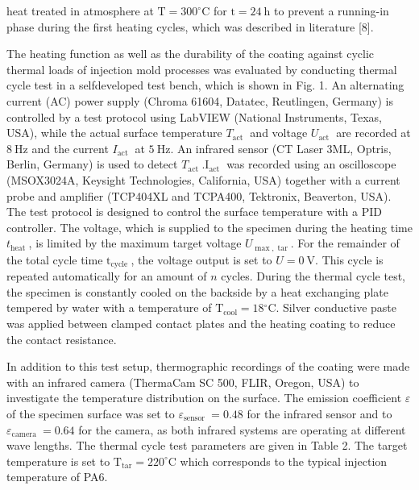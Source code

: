 \documentclass[10pt]{article}
\begin{document}
heat treated in atmosphere at $\mathrm{T}=300^{\circ} \mathrm{C}$ for $\mathrm{t}=24 \mathrm{~h}$ to prevent a running-in phase during the first heating cycles, which was described in literature [8].

The heating function as well as the durability of the coating against cyclic thermal loads of injection mold processes was evaluated by conducting thermal cycle test in a selfdeveloped test bench, which is shown in Fig. 1. An alternating current (AC) power supply (Chroma 61604, Datatec, Reutlingen, Germany) is controlled by a test protocol using LabVIEW (National Instruments, Texas, USA), while the actual surface temperature $T_{\text {act }}$ and voltage $U_{\text {act }}$ are recorded at $8 \mathrm{~Hz}$ and the current $I_{\text {act }}$ at $5 \mathrm{~Hz}$. An infrared sensor (CT Laser 3ML, Optris, Berlin, Germany) is used to detect $T_{\text {act }} . \mathrm{I}_{\text {act }}$ was recorded using an oscilloscope (MSOX3024A, Keysight Technologies, California, USA) together with a current probe and amplifier (TCP404XL and TCPA400, Tektronix, Beaverton, USA). The test protocol is designed to control the surface temperature with a PID controller. The voltage, which is supplied to the specimen during the heating time $t_{\text {heat }}$, is limited by the maximum target voltage $U_{\max , \operatorname{tar}}$. For the remainder of the total cycle time $\mathrm{t}_{\text {cycle }}$, the voltage output is set to $U=0 \mathrm{~V}$. This cycle is repeated automatically for an amount of $n$ cycles. During the thermal cycle test, the specimen is constantly cooled on the backside by a heat exchanging plate tempered by water with a temperature of $\mathrm{T}_{\mathrm{cool}}=18{ }^{\circ} \mathrm{C}$. Silver conductive paste was applied between clamped contact plates and the heating coating to reduce the contact resistance.

In addition to this test setup, thermographic recordings of the coating were made with an infrared camera (ThermaCam SC 500, FLIR, Oregon, USA) to investigate the temperature distribution on the surface. The emission coefficient $\varepsilon$ of the specimen surface was set to $\varepsilon_{\text {sensor }}=0.48$ for the infrared sensor and to $\varepsilon_{\text {camera }}=0.64$ for the camera, as both infrared systems are operating at different wave lengths. The thermal cycle test parameters are given in Table 2. The target temperature is set to $\mathrm{T}_{\mathrm{tar}}=220^{\circ} \mathrm{C}$ which corresponds to the typical injection temperature of PA6.
\end{document}
